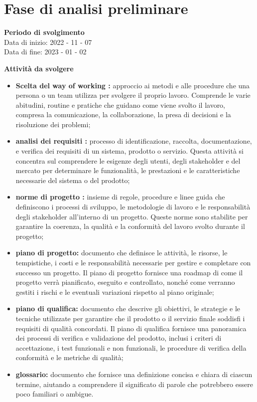 \section{Fase di analisi preliminare}

\textbf{Periodo di svolgimento}
\\ Data di inizio: 2022 - 11 - 07 \\ Data di fine: 2023 - 01 - 02

\textbf{Attività da svolgere}
    \begin{itemize}
        \item \textbf{Scelta del way of working :} approccio ai metodi e alle procedure che una persona o un team utilizza per svolgere il proprio lavoro. Comprende le varie abitudini, routine e pratiche che guidano come viene svolto il lavoro, compresa la comunicazione, la collaborazione, la presa di decisioni e la risoluzione dei problemi;
        \item \textbf{analisi dei requisiti :} processo di identificazione, raccolta, documentazione, e verifica dei requisiti di un sistema, prodotto o servizio. Questa attività si concentra sul comprendere le esigenze degli utenti, degli stakeholder e del mercato per determinare le funzionalità, le prestazioni e le caratteristiche necessarie del sistema o del prodotto;
        \item \textbf{norme di progetto :} insieme di regole, procedure e linee guida che definiscono i processi di sviluppo, le metodologie di lavoro e le responsabilità degli stakeholder all'interno di un progetto. Queste norme sono stabilite per garantire la coerenza, la qualità e la conformità del lavoro svolto durante il progetto;
        \item \textbf{piano di progetto:} documento che definisce le attività, le risorse, le tempistiche, i costi e le responsabilità necessarie per gestire e completare con successo un progetto. Il piano di progetto fornisce una roadmap di come il progetto verrà pianificato, eseguito e controllato, nonché come verranno gestiti i rischi e le eventuali variazioni rispetto al piano originale;        \item \textbf{piano di qualifica:} documento che descrive gli obiettivi, le strategie e le tecniche utilizzate per garantire che il prodotto o il servizio finale soddisfi i requisiti di qualità concordati. Il piano di qualifica fornisce una panoramica dei processi di verifica e validazione del prodotto, inclusi i criteri di accettazione, i test funzionali e non funzionali, le procedure di verifica della conformità e le metriche di qualità;
        \item \textbf{glossario:} documento che fornisce una definizione concisa e chiara di ciascun termine, aiutando a comprendere il significato di parole che potrebbero essere poco familiari o ambigue.
    \end{itemize}


